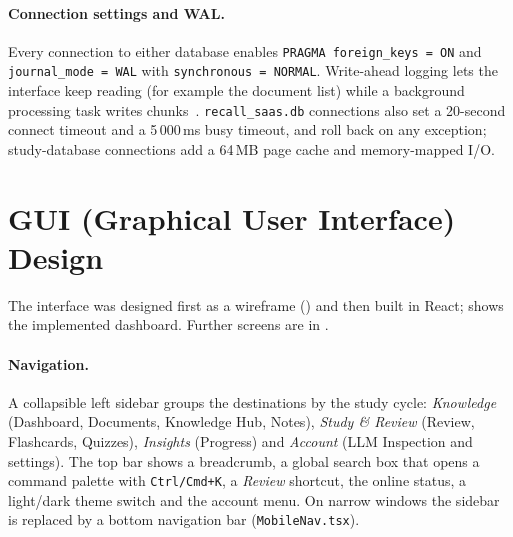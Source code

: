 \paragraph{Connection settings and WAL.}
Every connection to either database enables \texttt{PRAGMA foreign\_keys = ON} and
\texttt{journal\_mode = WAL} with \texttt{synchronous = NORMAL}. Write-ahead logging lets
the interface keep reading (for example the document list) while a background
processing task writes chunks~\cite{sqlite_wal}. \texttt{recall\_saas.db} connections
also set a 20-second connect timeout and a 5\,000\,ms busy timeout, and roll back on any
exception; study-database connections add a 64\,MB page cache and memory-mapped I/O.

\section{GUI (Graphical User Interface) Design}\label{sec:gui}

The interface was designed first as a wireframe () and then built in
React;  shows the implemented dashboard. Further screens are in
.



\paragraph{Navigation.}
A collapsible left sidebar groups the destinations by the study cycle:
\emph{Knowledge} (Dashboard, Documents, Knowledge Hub, Notes), \emph{Study \& Review}
(Review, Flashcards, Quizzes), \emph{Insights} (Progress) and \emph{Account} (LLM
Inspection and settings). The top bar shows a breadcrumb, a global search box that opens
a command palette with \texttt{Ctrl/Cmd+K}, a \emph{Review} shortcut, the online status,
a light/dark theme switch and the account menu. On narrow windows the sidebar is
replaced by a bottom navigation bar (\texttt{MobileNav.tsx}).


